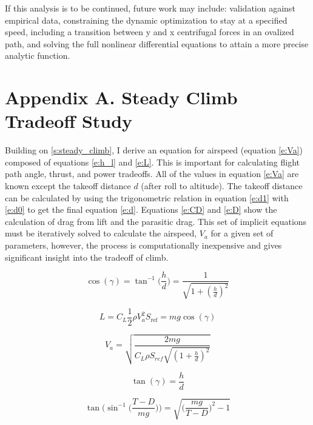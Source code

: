 \documentclass[10pt,english]{article}
\begin{document}
If this analysis is to be continued, future work may include: validation against empirical data, constraining the dynamic optimization to stay at a specified speed, including a transition between y and x centrifugal forces in an ovalized path, and solving the full nonlinear differential equations to attain a more precise analytic function.




\section{Appendix A. Steady Climb Tradeoff Study}

Building on \cref{s:steady_climb}, I derive an equation for airspeed (equation \ref{e:Va}) composed of equations \ref{e:h_l} and \ref{e:L}.  This is important for calculating flight path angle, thrust, and power tradeoffs.  All of the values in equation \ref{e:Va} are known except the takeoff distance $d$ (after roll to altitude).  The takeoff distance can be calculated by using the trigonometric relation in equation \ref{e:d1} with \ref{e:d0} to get the final equation \ref{e:d}.   Equations \ref{e:CD} and \ref{e:D} show the calculation of drag from lift and the parasitic drag.  This set of implicit equations must be iteratively solved to calculate the airspeed, $V_a$ for a given set of parameters, however, the process is computationally inexpensive and gives significant insight into the tradeoff of climb.

\begin{equation}
\label{e:h_l}
\cos(\gamma) = \tan^{-1}\bigg(\frac{h}{d}\bigg) = \frac{1}{\sqrt{1+(\frac{h}{d})^2}}
\end{equation}

\begin{equation}
\label{e:L}
L = C_L \frac{1}{2} \rho V_a^2 S_{\text{ref}} = m g \cos(\gamma)
\end{equation}

\begin{equation}
\label{e:Va}
V_a = \sqrt{\frac{2 m g}{C_L \rho S_{ref} \sqrt{(1+\frac{h}{d})^2}}}
\end{equation}

\begin{equation}
\label{e:d0}
\tan(\gamma) = \frac{h}{d} 
\end{equation}

\begin{equation}
\label{e:d1}
\tan \Bigg(\sin^{-1}\Bigg(\frac{T-D}{mg}\Bigg)\Bigg) = \sqrt{\bigg(\frac{m g}{T-D}\bigg)^2-1}
\end{equation}
\end{document}
